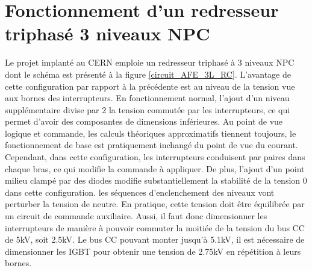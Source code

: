 \section{Fonctionnement d'un redresseur triphasé 3 niveaux NPC}
Le projet implanté au CERN emploie un redresseur triphasé à 3 niveaux NPC dont le schéma est présenté à la figure \ref{circuit_AFE_3L_RC}. L'avantage de cette configuration par rapport à la précédente est au niveau de la tension vue aux bornes des interrupteurs. En fonctionnement normal, l'ajout d'un niveau supplémentaire divise par 2 la tension commutée par les interrupteurs, ce qui permet d'avoir des composantes de dimensions inférieures. Au point de vue logique et commande, les calculs théoriques approximatifs tiennent toujours, le fonctionnement  de base est pratiquement inchangé du point de vue du courant. Cependant, dans cette configuration, les interrupteurs conduisent par paires dans chaque bras, ce qui modifie la commande à appliquer. De plus, l'ajout d'un point milieu \og clampé \fg{} par des diodes modifie substantiellement la stabilité de la tension 0 dans cette configuration. les séquences d'enclenchement des niveaux vont perturber la tension de neutre. En pratique, cette tension doit être équilibrée par un circuit de commande auxiliaire. Aussi, il faut donc dimensionner les interrupteurs de manière à pouvoir commuter la moitiée de la tension du bus CC de  5kV, soit 2.5kV. Le bus CC pouvant monter jusqu'à 5.1kV, il est nécessaire de dimensionner les IGBT pour obtenir une tension de 2.75kV en répétition à leurs bornes.